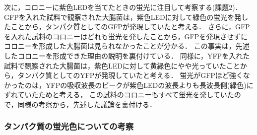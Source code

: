 \documentclass[a4paper,11pt, titlepage]{jsarticle}
\begin{document}
次に，コロニーに紫色LEDを当てたときの蛍光に注目して考察する(課題2)．
GFPを入れた試料で観察された大腸菌は，紫色LEDに対して緑色の蛍光を発したことから，タンパク質としてのGFPが発現していたと考える．
さらに，GFPを入れた試料のコロニーはどれも蛍光を発したことから，GFPを発現させずにコロニーを形成した大腸菌は見られなかったことが分かる．
この事実は，先述したコロニーを形成できた理由の説明を裏付けている．
同様に，YFPを入れた試料で観察された大腸菌は，紫色LEDに対して黄緑色にやや光っていたことから，タンパク質としてのYFPが発現していたと考える．
蛍光がGFPほど強くなかったのは，YFPの吸収波長のピークが紫色LEDの波長よりも長波長側(緑色)にずれていたためと考える，
この試料のコロニーもすべて蛍光を発していたので，同様の考察から，先述した議論を裏付ける．

\subsubsection{タンパク質の蛍光色についての考察}
\end{document}
